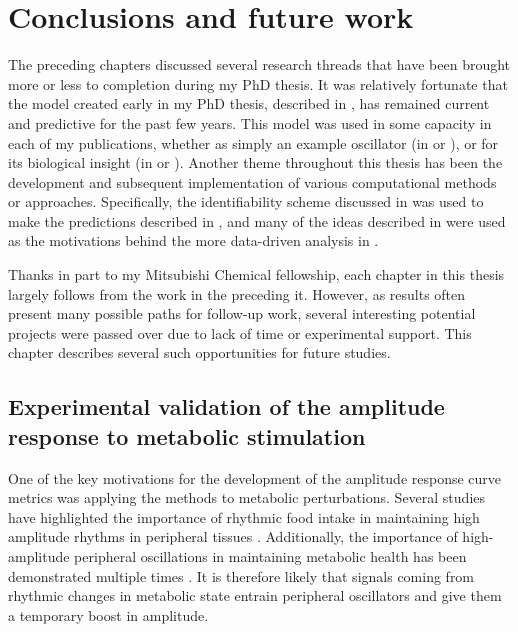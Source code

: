 \chapter{Conclusions and future work}

The preceding chapters discussed several research threads that have been brought more or less to completion during my PhD thesis.
It was relatively fortunate that the model created early in my PhD thesis, described in , has remained current and predictive for the past few years.
This model was used in some capacity in each of my publications, whether as simply an example oscillator (in  or ), or for its biological insight (in  or ).
Another theme throughout this thesis has been the development and subsequent implementation of various computational methods or approaches.
Specifically, the identifiability scheme discussed in  was used to make the predictions described in , and many of the ideas described in  were used as the motivations behind the more data-driven analysis in .

Thanks in part to my Mitsubishi Chemical fellowship, each chapter in this thesis largely follows from the work in the preceding it.
However, as results often present many possible paths for follow-up work, several interesting potential projects were passed over due to lack of time or experimental support.
This chapter describes several such opportunities for future studies.


\section{Experimental validation of the amplitude response to metabolic stimulation}\label{sec:chida}

One of the key motivations for the development of the amplitude response curve metrics was applying the methods to metabolic perturbations.
Several studies have highlighted the importance of rhythmic food intake in maintaining high amplitude rhythms in peripheral tissues \cite{Vollmers2009, Hatori2012}.
Additionally, the importance of high-amplitude peripheral oscillations in maintaining metabolic health has been demonstrated multiple times \cite{Hatori2012, Marcheva2010}.
It is therefore likely that signals coming from rhythmic changes in metabolic state entrain peripheral oscillators and give them a temporary boost in amplitude.

